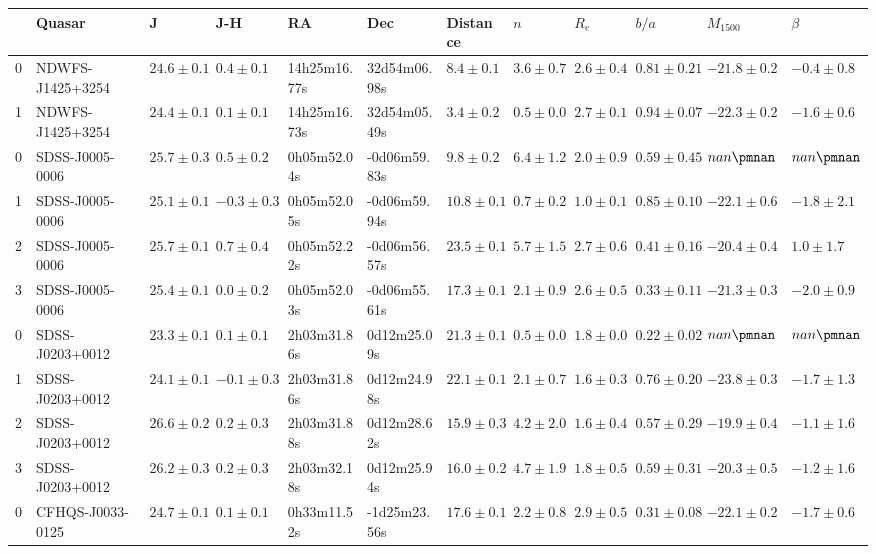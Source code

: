 \begin{tabular}{llllllllllll}
\toprule
{} &            Quasar &             J &           J-H &            RA &           Dec &      Distance &          $n$ &        $R_e$ &          $b/a$ &     $M_{1500}$ &       $\beta$ \\
\midrule
0 &  NDWFS-J1425+3254 &  $24.6\pm0.1$ &   $0.4\pm0.1$ &  14h25m16.77s &  32d54m06.98s &   $8.4\pm0.1$ &  $3.6\pm0.7$ &  $2.6\pm0.4$ &  $0.81\pm0.21$ &  $-21.8\pm0.2$ &  $-0.4\pm0.8$ \\
1 &  NDWFS-J1425+3254 &  $24.4\pm0.1$ &   $0.1\pm0.1$ &  14h25m16.73s &  32d54m05.49s &   $3.4\pm0.2$ &  $0.5\pm0.0$ &  $2.7\pm0.1$ &  $0.94\pm0.07$ &  $-22.3\pm0.2$ &  $-1.6\pm0.6$ \\
0 &   SDSS-J0005-0006 &  $25.7\pm0.3$ &   $0.5\pm0.2$ &   0h05m52.04s &  -0d06m59.83s &   $9.8\pm0.2$ &  $6.4\pm1.2$ &  $2.0\pm0.9$ &  $0.59\pm0.45$ &    $nan\pmnan$ &   $nan\pmnan$ \\
1 &   SDSS-J0005-0006 &  $25.1\pm0.1$ &  $-0.3\pm0.3$ &   0h05m52.05s &  -0d06m59.94s &  $10.8\pm0.1$ &  $0.7\pm0.2$ &  $1.0\pm0.1$ &  $0.85\pm0.10$ &  $-22.1\pm0.6$ &  $-1.8\pm2.1$ \\
2 &   SDSS-J0005-0006 &  $25.7\pm0.1$ &   $0.7\pm0.4$ &   0h05m52.22s &  -0d06m56.57s &  $23.5\pm0.1$ &  $5.7\pm1.5$ &  $2.7\pm0.6$ &  $0.41\pm0.16$ &  $-20.4\pm0.4$ &   $1.0\pm1.7$ \\
3 &   SDSS-J0005-0006 &  $25.4\pm0.1$ &   $0.0\pm0.2$ &   0h05m52.03s &  -0d06m55.61s &  $17.3\pm0.1$ &  $2.1\pm0.9$ &  $2.6\pm0.5$ &  $0.33\pm0.11$ &  $-21.3\pm0.3$ &  $-2.0\pm0.9$ \\
0 &   SDSS-J0203+0012 &  $23.3\pm0.1$ &   $0.1\pm0.1$ &   2h03m31.86s &   0d12m25.09s &  $21.3\pm0.1$ &  $0.5\pm0.0$ &  $1.8\pm0.0$ &  $0.22\pm0.02$ &    $nan\pmnan$ &   $nan\pmnan$ \\
1 &   SDSS-J0203+0012 &  $24.1\pm0.1$ &  $-0.1\pm0.3$ &   2h03m31.86s &   0d12m24.98s &  $22.1\pm0.1$ &  $2.1\pm0.7$ &  $1.6\pm0.3$ &  $0.76\pm0.20$ &  $-23.8\pm0.3$ &  $-1.7\pm1.3$ \\
2 &   SDSS-J0203+0012 &  $26.6\pm0.2$ &   $0.2\pm0.3$ &   2h03m31.88s &   0d12m28.62s &  $15.9\pm0.3$ &  $4.2\pm2.0$ &  $1.6\pm0.4$ &  $0.57\pm0.29$ &  $-19.9\pm0.4$ &  $-1.1\pm1.6$ \\
3 &   SDSS-J0203+0012 &  $26.2\pm0.3$ &   $0.2\pm0.3$ &   2h03m32.18s &   0d12m25.94s &  $16.0\pm0.2$ &  $4.7\pm1.9$ &  $1.8\pm0.5$ &  $0.59\pm0.31$ &  $-20.3\pm0.5$ &  $-1.2\pm1.6$ \\
0 &  CFHQS-J0033-0125 &  $24.7\pm0.1$ &   $0.1\pm0.1$ &   0h33m11.52s &  -1d25m23.56s &  $17.6\pm0.1$ &  $2.2\pm0.8$ &  $2.9\pm0.5$ &  $0.31\pm0.08$ &  $-22.1\pm0.2$ &  $-1.7\pm0.6$ \\

\end{tabular}

